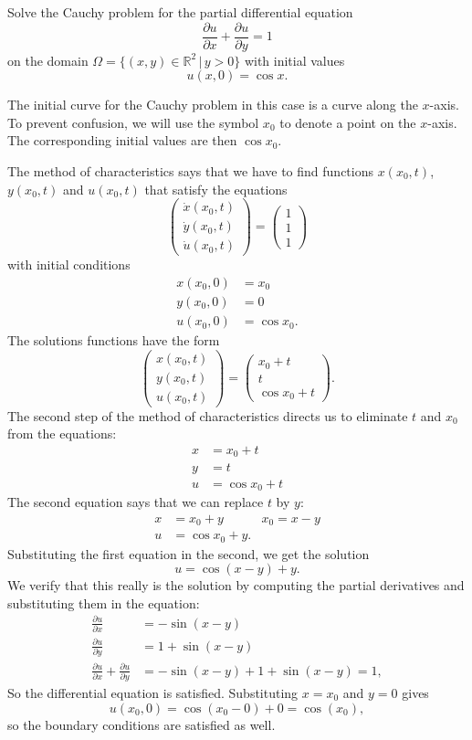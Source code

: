 Solve the Cauchy problem for the partial differential equation
\[
\frac{\partial u}{\partial x}
+
\frac{\partial u}{\partial y}
=1
\]
on the domain
$\Omega = \{ (x,y)\in\mathbb R^2\,|\, y > 0\}$
with initial values
\[
u(x,0)=\cos x.
\]

\begin{loesung}
The initial curve for the Cauchy problem in this case is a curve
along the $x$-axis.
To prevent confusion, we will use the symbol $x_0$ to denote a point
on the $x$-axis. 
The corresponding initial values are then $\cos x_0$.

The method of characteristics says that we have to find functions
$x(x_0, t)$, $y(x_0,t)$ and $u(x_0,t)$ that satisfy the equations
\[
\begin{pmatrix}
\dot x(x_0,t)\\
\dot y(x_0,t)\\
\dot u(x_0,t)
\end{pmatrix}
=\begin{pmatrix}
1\\1\\1
\end{pmatrix}
\]
with initial conditions
\begin{align*}
x(x_0,0)&=x_0\\
y(x_0,0)&=0\\
u(x_0,0)&=\cos x_0.
\end{align*}
The solutions functions have the form
\[
\begin{pmatrix}
x(x_0,t)\\
y(x_0,t)\\
u(x_0,t)
\end{pmatrix}
=
\begin{pmatrix}
x_0+t\\
t\\
\cos x_0 + t
\end{pmatrix}.
\]
The second step of the method of characteristics directs us to
eliminate $t$ and $x_0$ from the equations:
\begin{align*}
x&=x_0+t\\
y&=t\\
u&=\cos x_0 + t
\end{align*}
The second equation says that we can replace $t$ by $y$:
\begin{align*}
x&=x_0+y&x_0=x-y\\
u&=\cos x_0 + y.
\end{align*}
Substituting the first equation in the second, we get the solution
\[
u=\cos(x-y)+y.
\]
We verify that this really is the solution by computing the
partial derivatives and substituting them in the equation:
\begin{align*}
\frac{\partial u}{\partial x}
&=
-\sin(x-y)
\\
\frac{\partial u}{\partial y}
&=
1+\sin(x-y)
\\
\frac{\partial u}{\partial x}
+
\frac{\partial u}{\partial y}
&=
-\sin(x-y)
+
1+\sin(x-y)
=1,
\end{align*}
So the differential equation is satisfied.
Substituting $x=x_0$ and $y=0$ gives
\[
u(x_0,0) = \cos(x_0-0)+0 = \cos(x_0),
\]
so the boundary conditions are satisfied as well.
\end{loesung}

